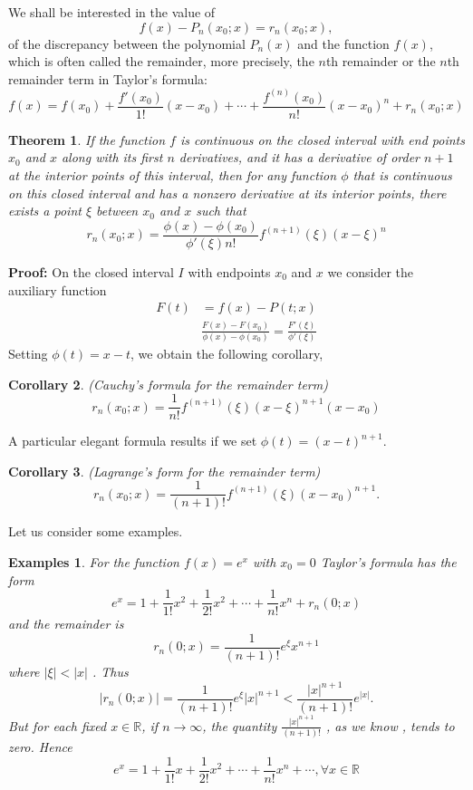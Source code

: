 \documentclass[a4paper,12pt]{article} %
\newtheorem{theorem}{Theorem}[section]
\newtheorem{corollary}[theorem]{Corollary}
\newtheorem{example}{Examples}
\begin{document}
We shall be interested in the value of 
\begin{equation}
    f(x) - P_n(x_0;x) = r_n(x_0;x),
\end{equation}
of the discrepancy between the polynomial $P_n(x)$ and the function $f(x)$,
which is often called the remainder, more precisely, the $n$th remainder 
or the $n$th remainder term in Taylor's formula:
\[
    f(x) = f(x_0) + \frac{f'(x_0)}{1!}(x - x_0) + 
    \cdots + \frac{f^{(n)}(x_0)}{n!}(x - x_0)^n + r_n(x_0;x)
    \]
\begin{theorem}
    \normalfont
    If the function $f$ is continuous on the closed interval with end
    points $x_0$ and $x$ along with its first $n$ derivatives, and it has a 
    derivative of order $n+1$ at the interior points of this interval, 
    then for any function $\phi$ that is continuous on this closed interval 
    and has a nonzero derivative at its interior points, there exists 
    a point $\xi$ between $x_0$ and $x$ such that 
    \begin{equation}
        r_n(x_0;x) = \frac{\phi(x) - \phi(x_0)}{\phi'(\xi)n!}f^{(n+1)}(\xi)(x-\xi)^n
    \end{equation}
\end{theorem}

\textbf{Proof:}  On the closed interval $I$  with endpoints $x_0$ and $x$ we consider 
the auxiliary function
\[
    \begin{split}
        F(t) &= f(x) - P(t;x)\\
        & \frac{F(x) - F(x_0)}{\phi(x) - \phi(x_0)} = \frac{F'(\xi)}{\phi'(\xi)}
    \end{split}
    \]
Setting $\phi(t) = x-t$, we obtain the following corollary,
\begin{corollary}{\rm (Cauchy's formula for the remainder term)}
    \[
        r_n(x_0;x) = \frac{1}{n!}f^{(n+1)}(\xi)(x-\xi)^{n+1}(x - x_0)
        \]
\end{corollary}

A particular elegant formula results if we set $\phi(t) = (x-t)^{n+1}$.
\begin{corollary}{\rm (Lagrange's form for the remainder term)}
    \[
        r_n(x_0; x) = \frac{1}{(n+1)!}f^{(n+1)}(\xi)(x - x_0)^{n+1}.
        \]
\end{corollary}

Let us consider some examples.
\begin{example}
    \normalfont
    For the function $f(x) = e^x$ with $x_0 = 0$ Taylor's formula has
    the form
    \[
        e^x = 1 + \frac{1}{1!}x^2 + \frac{1}{2!}x^2 + \cdots + \frac{1}{n!}x^n + r_n(0;x)
        \]
    and the remainder is 
    \[
        r_n(0;x) = \frac{1}{(n+1)!}e^{\xi}x^{n+1}
        \]
    where $\vert \xi \vert < \vert x \vert$  .
    Thus 
    \[
        \vert r_n(0;x)\vert  = \frac{1}{(n+1)!}e^{\xi}\vert x \vert^{n+1} < \frac{\vert x \vert^{n+1}}{(n+1)!}e^{\vert x \vert}.
        \]
    But for each fixed $x \in \mathbb{R}$, if $n \to \infty$, the quantity $\frac{\vert x \vert^{n+1}}{(n+1)!}$ , as we know ,
    tends to zero. Hence 
    \[
        e^x = 1 + \frac{1}{1!}x + \frac{1}{2!}x^2 + \cdots + \frac{1}{n!}x^n + \cdots, \forall x \in \mathbb{R}
\]
\end{example}
\end{document}
